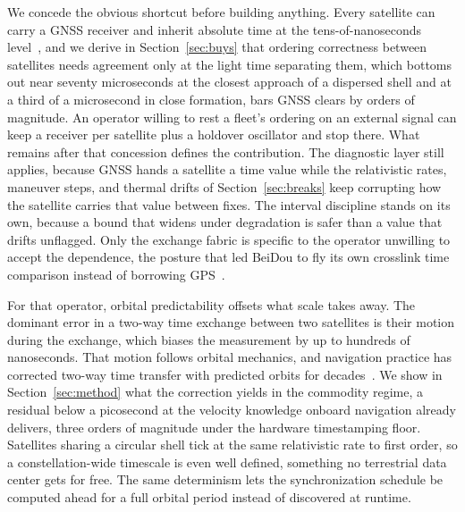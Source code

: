 \documentclass[twocolumn,10pt]{article}
\begin{document}
We concede the obvious shortcut before building anything. Every satellite can carry a GNSS receiver and inherit absolute time at the tens-of-nanoseconds level~\cite{pod,fccgen2}, and we derive in Section~\ref{sec:buys} that ordering correctness between satellites needs agreement only at the light time separating them, which bottoms out near seventy microseconds at the closest approach of a dispersed shell and at a third of a microsecond in close formation, bars GNSS clears by orders of magnitude. An operator willing to rest a fleet's ordering on an external signal can keep a receiver per satellite plus a holdover oscillator and stop there. What remains after that concession defines the contribution. The diagnostic layer still applies, because GNSS hands a satellite a time value while the relativistic rates, maneuver steps, and thermal drifts of Section~\ref{sec:breaks} keep corrupting how the satellite carries that value between fixes. The interval discipline stands on its own, because a bound that widens under degradation is safer than a value that drifts unflagged. Only the exchange fabric is specific to the operator unwilling to accept the dependence, the posture that led BeiDou to fly its own crosslink time comparison instead of borrowing GPS~\cite{li2025}.

For that operator, orbital predictability offsets what scale takes away. The dominant error in a two-way time exchange between two satellites is their motion during the exchange, which biases the measurement by up to hundreds of nanoseconds. That motion follows orbital mechanics, and navigation practice has corrected two-way time transfer with predicted orbits for decades~\cite{itu1153,li2025}. We show in Section~\ref{sec:method} what the correction yields in the commodity regime, a residual below a picosecond at the velocity knowledge onboard navigation already delivers, three orders of magnitude under the hardware timestamping floor. Satellites sharing a circular shell tick at the same relativistic rate to first order, so a constellation-wide timescale is even well defined, something no terrestrial data center gets for free. The same determinism lets the synchronization schedule be computed ahead for a full orbital period instead of discovered at runtime.
\end{document}
